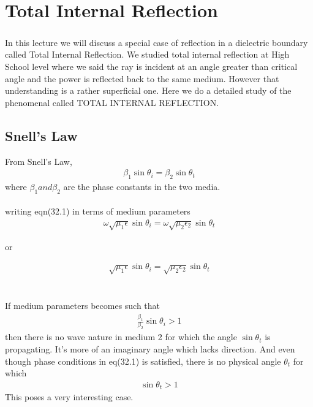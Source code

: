 \chapter{Total Internal Reflection}
\paragraph{}In this lecture we will discuss a special case of reflection in a dielectric boundary called Total Internal Reflection. We studied total internal reflection at High School level where we said the ray is incident at an angle greater than critical angle and the power is reflected back to the same medium. However that understanding is a rather superficial one. Here we do a detailed study of the phenomenal called TOTAL INTERNAL REFLECTION.

\section{Snell's Law}From Snell's Law,
\begin{align}
\beta_1 \sin\theta_i = \beta_2 \sin\theta_t
\end{align}
where $\beta_1 and \beta_2$ are the phase constants in the two media. \\ \\
writing eqn(32.1) in terms of medium parameters
\begin{align*}
\omega\sqrt{\mu_1\epsilon} \sin\theta_i = \omega\sqrt{\mu_2\epsilon_2}  \sin\theta_t
\end{align*}
\begin{center}
	or
\end{center}
\begin{align*}
\sqrt{\mu_1\epsilon} \sin\theta_i = \sqrt{\mu_2\epsilon_2}  \sin\theta_t
\end{align*} \\ \\
If medium parameters becomes such that
\begin{align}
\frac{\beta_1}{\beta_2}\sin\theta_i > 1
\end{align}then there is no wave nature in medium 2 for which the angle $\sin\theta_t$ is propagating. It's more of an imaginary angle which lacks direction.
And even though phase conditions in eq(32.1) is satisfied, there is no physical angle $\theta_t$ for which
\begin{align}
\sin\theta_t > 1
\end{align}This poses a very interesting case. \\ \\
